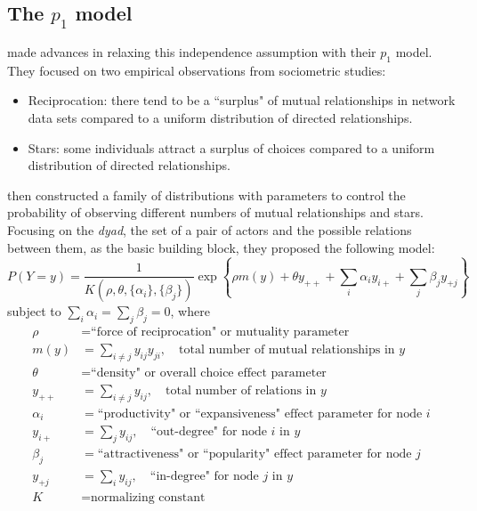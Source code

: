 \subsection{The $p_1$ model} \label{S:p1}
\citet{Holland:1981} made advances in relaxing this independence assumption  with 
their $p_1$ model.  They focused on two empirical observations from sociometric 
studies:
\begin{itemize}
\item Reciprocation: there tend to be a ``surplus" of mutual relationships in network 
data sets compared to a uniform distribution of directed relationships.
\item Stars: some individuals attract a surplus of choices compared to a uniform 
distribution of directed relationships.
\end{itemize}
\citeauthor{Holland:1981} then constructed a family of distributions with parameters 
to control the probability of observing different numbers of mutual relationships and 
stars.  
Focusing on the \textit{dyad}, the set of a pair of actors and the possible relations 
between them, as the basic building block, they proposed the following model:
\[
	P( Y = y ) = \frac{1}{ K( \rho, \theta, \{ \alpha_i \}, \{\beta_j \} )}\exp \left 
\{  \rho m(y) + \theta y_{++} + \sum_i \alpha_i y_{i+} +  \sum_j \beta_j y_{+j}\right 
\}
\]
subject to $\sum_i \alpha_i = \sum_j \beta_j = 0$, where
\begin{align*}
	\rho &= \text{``force of reciprocation" or mutuality parameter}\\
	m(y) &= \sum_{i \neq j} y_{ij}y_{ji}, \quad \text{total number of mutual relationships 
in $y$}\\
	\theta &= \text{``density" or overall choice effect parameter}\\
	y_{++} &= \sum_{i \neq j} y_{ij}, \quad  \text{total number of relations in $y$}\\
	\alpha_i &= \text{``productivity" or ``expansiveness" effect parameter for node $i
$}\\
	y_{i+} &= \sum_{j} y_{ij}, \quad  \text{``out-degree" for node $i$ in $y$}\\
	\beta_j &= \text{``attractiveness" or ``popularity" effect parameter for node $j$} 
\\
	y_{+j} &= \sum_{i} y_{ij}, \quad  \text{``in-degree" for node $j$ in $y$}\\
	K &= \text{normalizing constant}
\end{align*}

